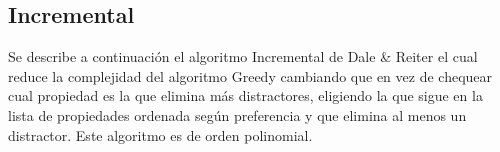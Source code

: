 

\subsection{Incremental}

Se describe a continuaci\'on el algoritmo Incremental de Dale \& Reiter el cual reduce la complejidad del algoritmo Greedy cambiando que en vez de chequear cual propiedad es la que elimina m\'as distractores, eligiendo la que sigue en la lista de propiedades ordenada seg\'un preferencia y que elimina al menos un distractor. Este algoritmo es de orden polinomial.\\


